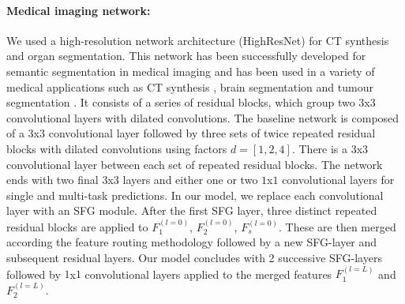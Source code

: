     \paragraph{Medical imaging network:} We used a high-resolution network architecture (HighResNet) \cite{wenqi} for CT synthesis and organ segmentation. This network has been successfully developed for semantic segmentation in medical imaging and has been used in a variety of medical applications such as CT synthesis \cite{bragman2018multi, kerstin}, brain segmentation \cite{wenqi} and tumour segmentation \cite{zach}. It consists of a series of residual blocks, which group two $3$x$3$ convolutional layers with dilated convolutions. The baseline network is composed of a $3$x$3$ convolutional layer followed by three sets of twice repeated residual blocks with dilated convolutions using factors $d=[1, 2, 4]$. There is a $3$x$3$ convolutional layer between each set of repeated residual blocks. The network ends with two final $3$x$3$ layers and either one or two $1$x$1$ convolutional layers for single and multi-task predictions. In our model, we replace each convolutional layer with an SFG module. After the first SFG layer, three distinct repeated residual blocks are applied to $F^{(l=0)}_{1}$, $F^{(l=0)}_{2}$, $F^{(l=0)}_{s}$. These are then merged according the feature routing methodology followed by a new SFG-layer and subsequent residual layers. Our model concludes with 2 successive SFG-layers followed by $1$x$1$ convolutional layers applied to the merged features $F^{(l=L)}_{1}$ and $F^{(l=L)}_{2}$. 

